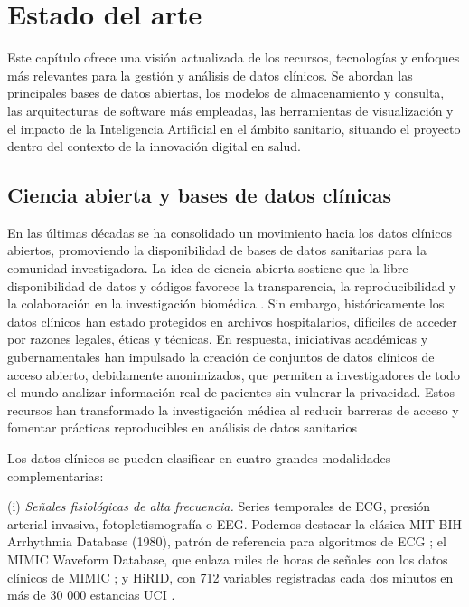\chapter{Estado del arte}

Este capítulo ofrece una visión actualizada de los recursos, tecnologías y enfoques más relevantes para la gestión y análisis de datos clínicos. Se abordan las principales bases de datos abiertas, los modelos de almacenamiento y consulta, las arquitecturas de software más empleadas, las herramientas de visualización y el impacto de la Inteligencia Artificial en el ámbito sanitario, situando el proyecto dentro del contexto de la innovación digital en salud.

\section{Ciencia abierta y bases de datos clínicas}

En las últimas décadas se ha consolidado un movimiento hacia los datos clínicos abiertos, promoviendo la disponibilidad de bases de datos sanitarias para la comunidad investigadora. La idea de ciencia abierta sostiene que la libre disponibilidad de datos y códigos favorece la transparencia, la reproducibilidad y la colaboración en la investigación biomédica \cite{Lvovs2025_balancing}. Sin embargo, históricamente los datos clínicos han estado protegidos en archivos hospitalarios, difíciles de acceder por razones legales, éticas y técnicas. En respuesta, iniciativas académicas y gubernamentales han impulsado la creación de conjuntos de datos clínicos de acceso abierto, debidamente anonimizados, que permiten a investigadores de todo el mundo analizar información real de pacientes sin vulnerar la privacidad. Estos recursos han transformado la investigación médica al reducir barreras de acceso y fomentar prácticas reproducibles en análisis de datos sanitarios

\newpage
Los datos clínicos se pueden clasificar en cuatro grandes modalidades complementarias:


(i) \emph{Señales fisiológicas de alta frecuencia.} Series temporales de ECG, presión arterial invasiva, fotopletismografía o EEG. Podemos destacar la clásica MIT-BIH Arrhythmia Database (1980), patrón de referencia para algoritmos de ECG \cite{Impact_MIT-BIH}; el MIMIC Waveform Database, que enlaza miles de horas de señales con los datos clínicos de MIMIC \cite{Moody2022_MIMICIVWaveform}; y HiRID, con 712 variables registradas cada dos minutos en más de 30 000 estancias UCI \cite{Faltys2021HiRID}.

